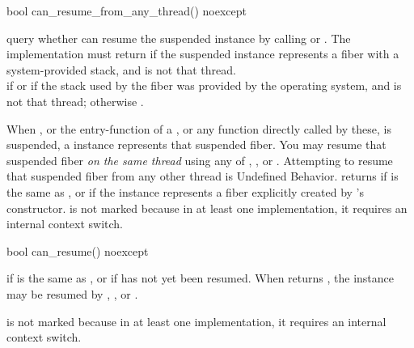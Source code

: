%
\begin{itemdecl}
bool can_resume_from_any_thread() noexcept
\end{itemdecl}

\begin{itemdescr}
\pnum
query whether \currthread can resume the suspended \fiber instance by calling
\xtresume or \xtresumewith. The implementation must return  if the
suspended \fiber instance represents a fiber with a system-provided stack, and
\currthread is not that thread.\\
\returns {} if  or if the stack used by the fiber was
provided by the operating system, and \currthread is not that thread; otherwise
.\\
\begin{note}When , or the entry-function of a \thread, or any
function directly called by these, is suspended, a \fiber instance represents
that suspended fiber. You may resume that suspended fiber
\emph{on the same thread} using any of \resume, \resumewith, \xtresume or
\xtresumewith. Attempting to resume that suspended fiber from any other thread
is Undefined Behavior. \canxtresume returns  if \currthread is the
same as \lastthread, or if the \fiber instance represents a fiber explicitly
created by \fiber's constructor. \canxtresume is not marked 
because in at least one implementation, it requires an internal context switch.
\end{note}
\end{itemdescr}

%
\begin{itemdecl}
bool can_resume() noexcept
\end{itemdecl}

\begin{itemdescr}
\pnum
\returns {} if \currthread is the same as \lastthread, or if
 has not yet been resumed. When \canresume returns ,
the \fiber instance may be resumed by \resume, \resumewith, \xtresume or
\xtresumewith.\\
\begin{note} \canresume is not marked  because in at least one
implementation, it requires an internal context switch.\end{note}
\end{itemdescr}



